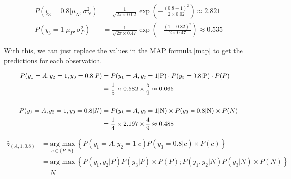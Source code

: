 \documentclass[12pt]{article}
\begin{document}
\begin{enumerate}[leftmargin=\labelsep]
    \begin{equation*}
        \begin{aligned}
            P(y_3 = 0.8|\mu_N, \sigma_N^2) &= \frac{1}{\sqrt{2\pi \times 0.02}} \exp\left(-\frac{(0.8 - 1)^2}{2 \times 0.02}\right) \approx 2.821\\
            P(y_3 = 1|\mu_P, \sigma_P^2) &= \frac{1}{\sqrt{2\pi \times 0.47}} \exp\left(-\frac{(1 - 0.82)^2}{2 \times 0.47}\right) \approx 0.535
        \end{aligned}
    \end{equation*}

    \vspace{10pt}
    With this, we can just replace the values in the MAP formula \eqref{map} to get the predictions for each observation.

    \begin{equation*}
        \small
        \begin{aligned}
        P(y_1 = A, y_2 = 1, y_3 = 0.8 | P) &= P(y_1 = A, y_2 = 1 | \text{P}) \cdot P(y_3 = 0.8 | \text{P}) \cdot P(P) \\
        &= \frac{1}{5} \times 0.582 \times \frac{5}{9} \approx 0.065\\
        \\
        P(y_1 = A, y_2 = 1, y_3 = 0.8 | N) &= P(y_1 = A, y_2 = 1 | \text{N}) \times P(y_3 = 0.8 | \text{N}) \times P(N) \\
        &= \frac{1}{4} \times 2.197 \times \frac{4}{9} \approx 0.488\\
        \end{aligned}
    \end{equation*}

    \begin{equation*}
    \begin{aligned}
        \hat{z}_{(A, 1, 0.8)} &= \underset{c \in \{P,N\}}{\text{arg max}} \medspace \left\{P(y_1 = A, y_2 = 1 | c) P(y_3 = 0.8| c) \times P(c)\right\}\\
                    & = \text{arg max} \medspace \left\{P(y_1, y_2 | P) P(y_3| P) \times P(P); P(y_1, y_2 | N) P(y_3| N) \times P(N)\right\} \\
                    & = N
    \end{aligned}
    \end{equation*}


\end{enumerate}
\end{document}
